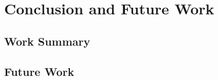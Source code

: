 
\chapter{Conclusion and Future Work}\label{chapter:Conclusion and Future Work}

\section{Work Summary}

\section{Future Work}